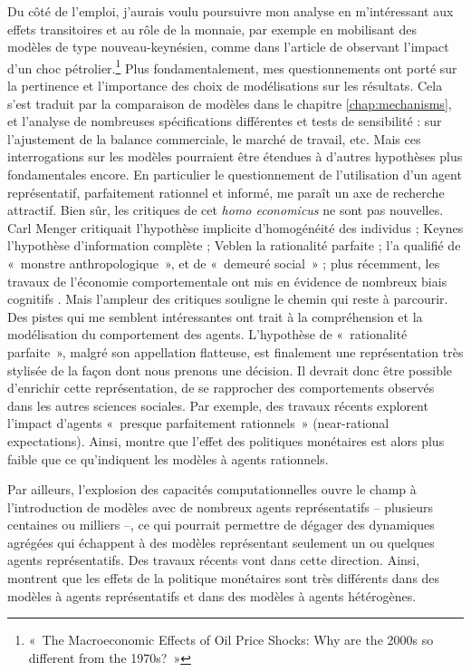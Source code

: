 Du côté de l’emploi, j’aurais voulu poursuivre mon analyse en m’intéressant aux effets transitoires et au rôle de la monnaie, par exemple en mobilisant des modèles de type nouveau-keynésien, comme dans l'article de \citet{Blanchard2007} observant l'impact d'un choc pétrolier.\footnote{«~The Macroeconomic Effects of Oil Price Shocks: Why are the 2000s so different from the 1970s?~»}
Plus fondamentalement, mes questionnements ont porté sur la pertinence et l’importance des choix de modélisations sur les résultats. Cela s’est traduit par la comparaison de modèles dans le chapitre \ref{chap:mechanisms}, et l’analyse de nombreuses spécifications différentes et tests de sensibilité : sur l’ajustement de la balance commerciale, le marché de travail, etc. 
Mais ces interrogations sur les modèles pourraient être étendues à d'autres hypothèses plus fondamentales encore. En particulier le questionnement de l’utilisation d’un agent représentatif, parfaitement rationnel et informé, me paraît un axe de recherche attractif. Bien sûr, les critiques de cet \textit{homo economicus} ne sont pas nouvelles. Carl Menger critiquait l’hypothèse implicite d’homogénéité des individus ; Keynes l’hypothèse d’information complète ; Veblen la rationalité parfaite ; \citet{Bourdieu1977} l’a qualifié de «~monstre anthropologique~», et \citet{Sen2012} de «~demeuré social~» ; plus récemment, les travaux de l’économie comportementale ont mis en évidence de nombreux biais cognitifs \citep{Thaler2009,Kahneman2011}.
Mais l’ampleur des critiques souligne le chemin qui reste à parcourir. Des pistes qui me semblent intéressantes ont trait à la compréhension et la modélisation du comportement des agents. L'hypothèse de «~rationalité parfaite~», malgré son appellation flatteuse, est finalement une représentation très stylisée de la façon dont nous prenons une décision. Il devrait donc être possible d'enrichir cette représentation, de se rapprocher des comportements observés dans les autres sciences sociales. Par exemple, des travaux récents explorent l’impact d’agents «~presque parfaitement rationnels~» (near-rational expectations). Ainsi, \citet{Farhi2016} montre que l’effet des politiques monétaires est alors plus faible que ce qu’indiquent les modèles à agents rationnels.

Par ailleurs, l’explosion des capacités computationnelles ouvre le champ à l’introduction de modèles avec de nombreux agents représentatifs – plusieurs centaines ou milliers –, ce qui pourrait permettre de dégager des dynamiques agrégées qui échappent à des modèles représentant seulement un ou quelques agents représentatifs. Des travaux récents vont dans cette direction. Ainsi, \citet{Kaplan2016} montrent que les effets de la politique monétaires sont très différents dans des modèles à agents représentatifs et dans des modèles à agents hétérogènes. 

